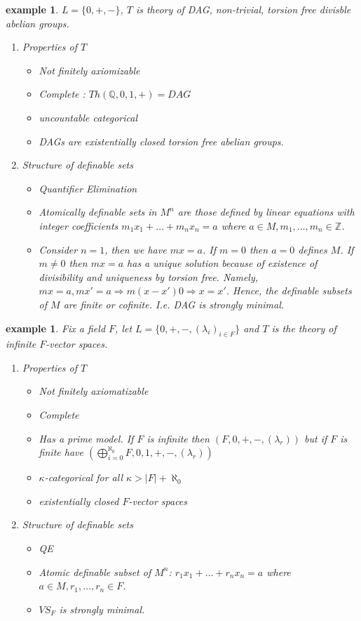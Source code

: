 \documentclass[letterpaper, 12pt]{article}
\newcommand{\fin}{\qquad \quad \hfill \framebox[1.75mm][l]{\,}}
\newcommand{\bZ}{\mathbb{Z}}
\newcommand{\bQ}{\mathbb{Q}}
\theoremstyle{stdthm}
\theoremstyle{stddef}
\newtheorem{eg}[thm]{example} %
\theoremstyle{stdnonum}
\theoremstyle{stdqands}
\theoremstyle{stdbold}
\begin{document}
\begin{eg}
$L = \{0,+,-\}$, $T$ is theory of DAG, non-trivial, torsion free divisble abelian groups. 
\begin{enumerate}
\item Properties of $T$
\begin{itemize}
\item Not finitely axiomizable
\item Complete : $Th(\bQ,0,1,+) = DAG$ 
\item uncountable categorical 
\item DAGs are existentially closed torsion free abelian groups. 
\end{itemize}
\item Structure of definable sets
\begin{itemize}
\item Quantifier Elimination
\item Atomically definable sets in $M^n$ are those defined by linear equations with integer coefficients $m_1x_1 + \dots + m_nx_n = a$ where $a \in M, m_1, \dots, m_n \in \bZ$. 
\item Consider $n=1$, then we have $mx=a$. If $m = 0$ then $a=0$ defines $M$. If $m\neq 0$ then $mx=a$ has a unique solution because of existence of divisibility and uniqueness by torsion free. Namely, $mx=a, mx' = a \Rightarrow m(x-x') 0 \Rightarrow x = x'$.  Hence, the definable subsets of $M$ are finite or cofinite. I.e. DAG is strongly minimal. 
\end{itemize}

\end{enumerate}

\end{eg}

\begin{eg}
Fix a field $F$, let $L = \{0,+,-,(\lambda_i)_{i\in F}\}$ and $T$ is the theory of infinite $F$-vector spaces. 
\begin{enumerate}
\item Properties of $T$
\begin{itemize}
\item Not finitely axiomatizable
\item Complete
\item Has a prime model. If $F$ is infinite then $(F,0,+,-,(\lambda_r))$ but if $F$ is finite have $(\bigoplus_{i=0}^{\aleph_0} F, 0,1,+,-,(\lambda_r))$
\item $\kappa$-categorical for all $\kappa > |F| + \aleph_0$
\item existentially closed $F$-vector spaces
\end{itemize}
\item Structure of definable sets
\begin{itemize}
\item QE
\item Atomic definable subset of $M^n$: $r_1x_1 + \dots + r_nx_n = a$ where $a \in M, r_1,\dots, r_n \in F$. 
\item $VS_F$ is strongly minimal. 
\end{itemize}

\end{enumerate}

\end{eg}
\end{document}
